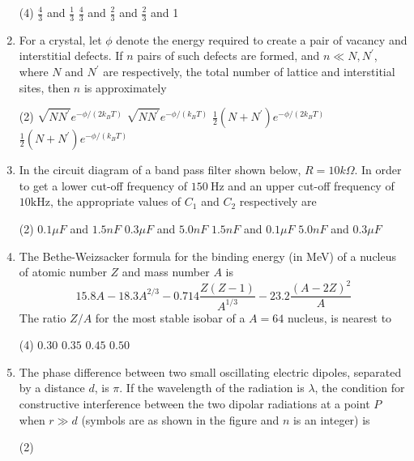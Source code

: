 \begin{enumerate}
 \begin{tasks}(4)
	\task[\textbf{a.}] $\frac{4}{3}$ and $\frac{1}{3}$
	\task[\textbf{b.}] $\frac{4}{3}$ and $\frac{2}{3}$
	 and $\frac{2}{3}$
	 and 1
\end{tasks}
\item For a crystal, let $\phi$ denote the energy required to create a pair of vacancy and interstitial defects. If $n$ pairs of such defects are formed, and $n \ll N, N^{\prime}$, where $N$ and $N^{\prime}$ are respectively, the total number of lattice and interstitial sites, then $n$ is approximately
 \begin{tasks}(2)
	\task[\textbf{a.}]$\sqrt{N N^{\prime}} e^{-\phi /\left(2 k_{B} T\right)}$
	\task[\textbf{b.}] $\sqrt{N N^{\prime}} e^{-\phi /\left(k_{B} T\right)}$
	\task[\textbf{c.}]$\frac{1}{2}\left(N+N^{\prime}\right) e^{-\phi /\left(2 k_{B} T\right)}$
	\task[\textbf{d.}] $\frac{1}{2}\left(N+N^{\prime}\right) e^{-\phi /\left(k_{B} T\right)}$
\end{tasks}
\item In the circuit diagram of a band pass filter shown below, $R=10 k \Omega$.	
In order to get a lower cut-off frequency of $150 \mathrm{~Hz}$ and an upper cut-off frequency of $10 \mathrm{kHz}$, the appropriate values of $C_{1}$ and $C_{2}$ respectively are
 \begin{tasks}(2)
	\task[\textbf{a.}]$0.1 \mu F$ and $1.5 n F$
	\task[\textbf{b.}]$0.3 \mu F$ and $5.0 n F$
	\task[\textbf{c.}] $1.5 n F$ and $0.1 \mu F$
	\task[\textbf{d.}]  $5.0 n F$ and $0.3 \mu F$
\end{tasks}
\item The Bethe-Weizsacker formula for the binding energy (in MeV) of a nucleus of atomic number $Z$ and mass number $A$ is
$$
15.8 A-18.3 A^{2 / 3}-0.714 \frac{Z(Z-1)}{A^{1 / 3}}-23.2 \frac{(A-2 Z)^{2}}{A}
$$
The ratio $Z / A$ for the most stable isobar of a $A=64$ nucleus, is nearest to
 \begin{tasks}(4)
	\task[\textbf{a.}]$0.30$
	\task[\textbf{b.}]$0.35$
	\task[\textbf{c.}]$0.45$
	\task[\textbf{d.}] $0.50$
\end{tasks}
\item The phase difference between two small oscillating electric dipoles, separated by a distance $d$, is $\pi$. If the wavelength of the radiation is $\lambda$, the condition for constructive interference between the two dipolar radiations at a point $P$ when $r \gg d$ (symbols are as shown in the figure and $n$ is an integer) is
 \begin{tasks}(2)

\end{tasks}
\end{enumerate}
